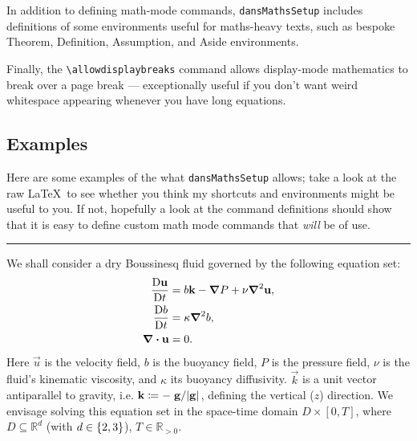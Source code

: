 In addition to defining math-mode commands, \texttt{dansMathsSetup} includes definitions of some environments useful for maths-heavy texts, such as bespoke Theorem, Definition, Assumption, and Aside environments.

Finally, the \verb!\allowdisplaybreaks! command allows display-mode mathematics to break over a page break --- exceptionally useful if you don't want weird whitespace appearing whenever you have long equations.

\subsection{Examples}
Here are some examples of the what \texttt{dansMathsSetup} allows; take a look at the raw \LaTeX\ to see whether you think my shortcuts and environments might be useful to you.
If not, hopefully a look at the command definitions should show that it is easy to define custom math mode commands that \textit{will} be of use.

\noindent\rule{\textwidth}{0.4pt}

We shall consider a dry Boussinesq fluid governed by the following equation set:
\begin{align}
    \frac{\operatorname{D}\!{\boldsymbol{\mathbf{u}}}}{\operatorname{D}\!{t}}
    &=
    b \boldsymbol{\mathbf{k}}
  - \grad{P}
  + \nu \grad^2{\boldsymbol{\mathbf{u}}},
    \label{eq:SFBoussinesq_momentum}
    \\
    \frac{\operatorname{D}\!{b}}{\operatorname{D}\!{t}}
    &=
    \kappa\grad^2{b},
    \label{eq:SFBoussinesq_buoyancy}
    \\
    \div{\ensuremath{\boldsymbol{\mathbf{u}}}}
    &=
    0.
    \label{eq:SFBoussinesq_mass}
\end{align}
Here $\vec{u}$ is the velocity field, $b$ is the buoyancy field, $P$ is the pressure field, $\nu$ is the fluid's kinematic viscosity, and $\kappa$ its buoyancy diffusivity.
$\vec{k}$ is a unit vector antiparallel to gravity, i.e. $\vec{k} \coloneqq - \flatfrac{\vec{g}}{\abs{\vec{g}}}$, defining the vertical ($\unit{z}$) direction.
We envisage solving this equation set in the space-time domain $D \times [0,T]$, where $D \subseteq \mathbb{R}^d$ (with $d \in  \left\{ 2,3 \right\} $), $T \in \mathbb{R}_{>0}$.

